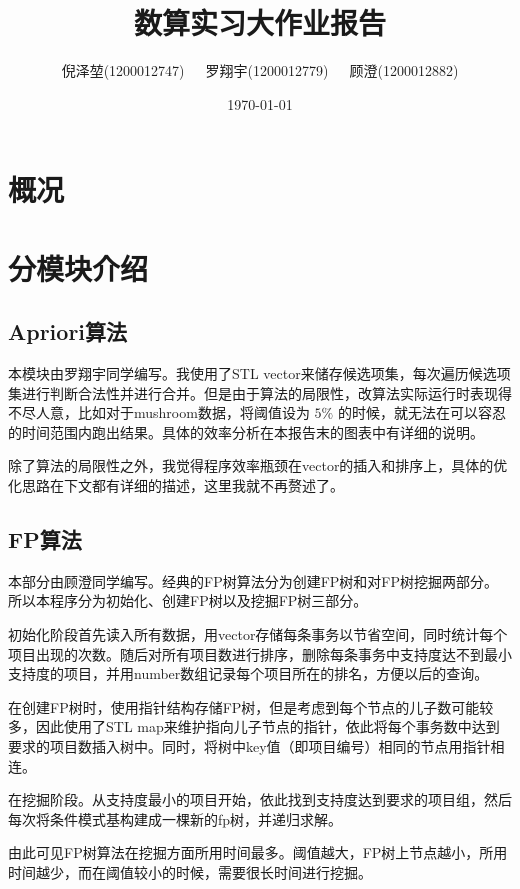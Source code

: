 \documentclass[a4paper,9pt]{article}
\title{\textbf{数算实习大作业报告}}
\author{\small{倪泽堃(1200012747)\ \ \ 罗翔宇(1200012779)\ \ \ 顾澄(1200012882)}}
\date{\today}
\begin{document}
\maketitle
\section{概况}

\section{分模块介绍}

\subsection{Apriori算法}
本模块由罗翔宇同学编写。我使用了STL vector来储存候选项集，每次遍历候选项集进行判断合法性并进行合并。但是由于算法的局限性，改算法实际运行时表现得不尽人意，比如对于mushroom数据，将阈值设为 $5\%$ 的时候，就无法在可以容忍的时间范围内跑出结果。具体的效率分析在本报告末的图表中有详细的说明。

除了算法的局限性之外，我觉得程序效率瓶颈在vector的插入和排序上，具体的优化思路在下文都有详细的描述，这里我就不再赘述了。
\subsection{FP算法}
本部分由顾澄同学编写。经典的FP树算法分为创建FP树和对FP树挖掘两部分。所以本程序分为初始化、创建FP树以及挖掘FP树三部分。

初始化阶段首先读入所有数据，用vector存储每条事务以节省空间，同时统计每个项目出现的次数。随后对所有项目数进行排序，删除每条事务中支持度达不到最小支持度的项目，并用number数组记录每个项目所在的排名，方便以后的查询。

在创建FP树时，使用指针结构存储FP树，但是考虑到每个节点的儿子数可能较多，因此使用了STL map来维护指向儿子节点的指针，依此将每个事务数中达到要求的项目数插入树中。同时，将树中key值（即项目编号）相同的节点用指针相连。

在挖掘阶段。从支持度最小的项目开始，依此找到支持度达到要求的项目组，然后每次将条件模式基构建成一棵新的fp树，并递归求解。

由此可见FP树算法在挖掘方面所用时间最多。阈值越大，FP树上节点越小，所用时间越少，而在阈值较小的时候，需要很长时间进行挖掘。
\end{document}
